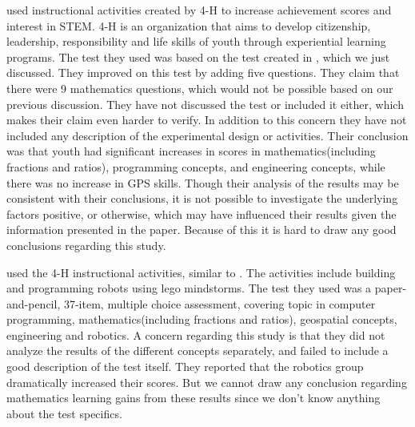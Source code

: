 \bigskip\noindent
{} used instructional activities created by 4-H to increase achievement scores and interest in STEM. 4-H is an organization that aims to develop citizenship, leadership, responsibility and life skills of youth through experiential learning programs. The test they used was based on the test created in \cite{barker2007robotics}, which we just discussed. They improved on this test by adding five questions. They claim that there were 9 mathematics questions, which would not be possible based on our previous discussion. They have not discussed the test or included it either, which makes their claim even harder to verify. 
In addition to this concern they have not included any description of the experimental design or activities. 
Their conclusion was that youth had significant increases in scores in mathematics(including fractions and ratios), programming concepts, and engineering concepts, while there was no increase in GPS skills. 
Though their analysis of the results may be consistent with their conclusions, it is not possible to investigate the underlying factors positive, or otherwise, which may have influenced their results given the information presented in the paper.
Because of this it is hard to draw any good conclusions regarding this study.\cite{nugent2008effect}

\bigskip\noindent
{} used the 4-H instructional activities, similar to . The activities include building and programming robots using lego mindstorms. The test they used was a paper-and-pencil, 37-item, multiple choice assessment, covering topic in computer programming, mathematics(including fractions and ratios), geospatial concepts, engineering and robotics. 
A concern regarding this study is that they did not analyze the results of the different concepts separately, and failed to include a good description of the test itself. 
They reported that the robotics group dramatically increased their scores. But we cannot draw any conclusion regarding mathematics learning gains from these results since we don't know anything about the test specifics.\cite{nugent2009use}

